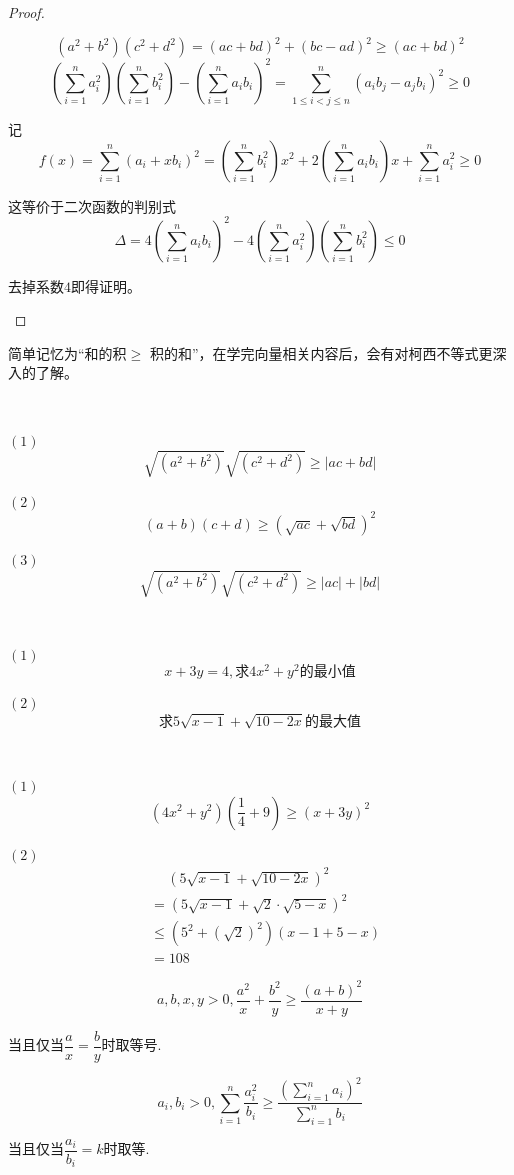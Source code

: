 \begin{proof}
    \ 

    \begin{way1}
    \[(a^2+b^2)(c^2+d^2)=(ac+bd)^2+(bc-ad)^2\geq (ac+bd)^2\]
    \[(\sum_{i=1}^{n}a_i^2)(\sum_{i=1}^{n}b_i^2)-(\sum_{i=1}^{n}a_ib_i)^2=
    \sum_{1\leq i<j\leq n}^{n}(a_ib_j-a_jb_i)^2\geq 0\]
    \end{way1}
    \begin{way2}
    记\[f(x)=\sum_{i=1}^{n}(a_i+xb_i)^2
    =(\sum_{i=1}^{n}b_i^2)x^2+2(\sum_{i=1}^{n}a_ib_i)x+\sum_{i=1}^{n}a_i^2\geq 0\]

    这等价于二次函数的判别式
    \[\Delta=4(\sum_{i=1}^{n}a_ib_i)^2-4(\sum_{i=1}^{n}a_i^2)(\sum_{i=1}^{n}b_i^2)\leq 0\]
    
    去掉系数$4$即得证明。
    \end{way2}
\end{proof}
简单记忆为“和的积$\geq$ 积的和”，在学完向量相关内容后，会有对柯西不等式更深入的了解。
\begin{corollary}
    \ 

    $(1)$\[\sqrt{(a^2+b^2)}\sqrt{(c^2+d^2)}\geq |ac+bd|\]

    $(2)$\[(a+b)(c+d)\geq(\sqrt{ac}+\sqrt{bd})^2\]

    $(3)$\[\sqrt{(a^2+b^2)}\sqrt{(c^2+d^2)}\geq |ac|+|bd|\]
\end{corollary}
\begin{example}
    \ 

    $(1)$
    \[x+3y=4,\text{求}4x^2+y^2\text{的最小值}\]   

    $(2)$
    \[\text{求}5\sqrt{x-1}+\sqrt{10-2x}\text{的最大值}\]
\end{example}
\begin{jie}
    \ 

    $(1)$
    \[(4x^2+y^2)(\frac{1}{4}+9)\geq(x+3y)^2\]

    $(2)$
    \begin{align*}
    &\quad\ (5\sqrt{x-1}+\sqrt{10-2x})^2 \\
    &=(5\sqrt{x-1}+\sqrt{2}\cdot\sqrt{5-x})^2\\
    &\leq(5^2+(\sqrt{2})^2)(x-1+5-x) \\
    &=108
    \end{align*}
  
\end{jie}
\begin{theorem}[权方和不等式]\label{thm:权方和不等式}
    \[a,b,x,y>0,\frac{a^2}{x}+\frac{b^2}{y}\geq\frac{(a+b)^2}{x+y}\]
    
    当且仅当$\dfrac{a}{x}=\dfrac{b}{y}$时取等号.

    \[a_i,b_i>0,\sum_{i=1}^{n}\frac{a_i^2}{b_i}\geq\frac{(\sum_{i=1}^{n}a_i)^2}{\sum_{i=1}^{n}b_i}\]

    当且仅当$\dfrac{a_i}{b_i}=k$时取等.
\end{theorem}
